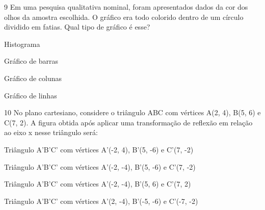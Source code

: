 \num{9} Em uma pesquisa qualitativa nominal, foram apresentados dados da cor
dos olhos da amostra escolhida. O gráfico era todo colorido dentro de um
círculo dividido em fatias. Qual tipo de gráfico é esse?

\begin{escolha}
\item
  Histograma
\item
  Gráfico de barras
\item
  Gráfico de colunas
\item
  Gráfico de linhas
\end{escolha}



\num{10} No plano cartesiano, considere o triângulo ABC com vértices A(2, 4),
B(5, 6) e C(7, 2). A figura obtida após aplicar uma transformação de
reflexão em relação ao eixo x nesse triângulo será:

\begin{escolha}
\item Triângulo A'B'C' com vértices A'(-2, 4), B'(5, -6) e C'(7, -2)
\item Triângulo A'B'C' com vértices A'(-2, -4), B'(5, -6) e C'(7, -2)
\item Triângulo A'B'C' com vértices A'(-2, -4), B'(5, 6) e C'(7, 2)
\item Triângulo A'B'C' com vértices A'(2, -4), B'(-5, -6) e C'(-7, -2)
\end{escolha}


